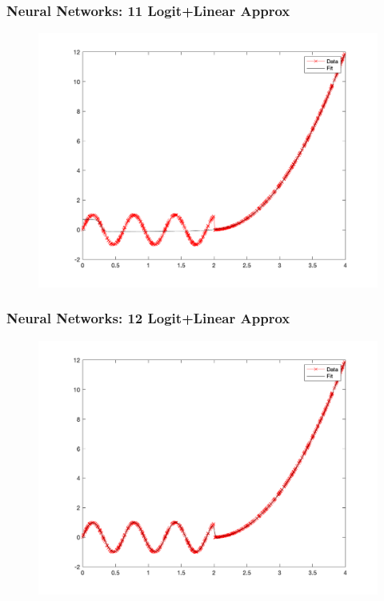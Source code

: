 \documentclass{beamer}
\begin{document}
\begin{frame}
\frametitle[alignment=center]{Neural Networks: 11 Logit+Linear Approx}
\begin{figure}
\includegraphics[scale=0.5]{NN_Example/Fig_Shallow_11.png}
\end{figure}
\end{frame}

\begin{frame}
\frametitle[alignment=center]{Neural Networks: 12 Logit+Linear Approx}
\begin{figure}
\includegraphics[scale=0.5]{NN_Example/Fig_Shallow_12.png}
\end{figure}
\end{frame}
\end{document}
